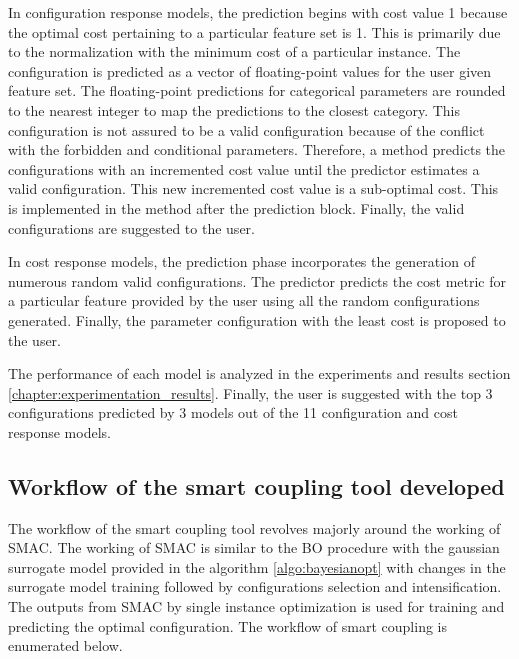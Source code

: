 In configuration response models, the prediction begins with cost value 1 because the optimal cost pertaining to a particular feature set is 1. This is primarily due to the normalization with the minimum cost of a particular instance. The configuration is predicted as a vector of floating-point values for the user given feature set. The floating-point predictions for categorical parameters are rounded to the nearest integer to map the predictions to the closest category. This configuration is not assured to be a valid configuration because of the conflict with the forbidden and conditional parameters. Therefore, a method predicts the configurations with an incremented cost value until the predictor estimates a valid configuration. This new incremented cost value is a sub-optimal cost. This is implemented in the method after the prediction block. Finally, the valid configurations are suggested to the user.

In cost response models, the prediction phase incorporates the generation of numerous random valid configurations. The predictor predicts the cost metric for a particular feature provided by the user using all the random configurations generated. Finally, the parameter configuration with the least cost is proposed to the user.

The performance of each model is analyzed in the experiments and results section \ref{chapter:experimentation_results}. Finally, the user is suggested with the top 3 configurations predicted by 3 models out of the 11 configuration and cost response models.

\subsection{Workflow of the smart coupling tool developed}
\label{section:smac_smartcoupling_algorithm}

The workflow of the smart coupling tool revolves majorly around the working of SMAC. The working of SMAC is similar to the BO procedure with the gaussian surrogate model provided in the algorithm \ref{algo:bayesianopt} with changes in the surrogate model training followed by configurations selection and intensification. The outputs from SMAC by single instance optimization is used for training and predicting the optimal configuration. The workflow of smart coupling is enumerated below.

